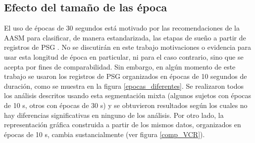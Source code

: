 
\subsection{Efecto del tamaño de las época}

El uso de épocas de 30 segundos está motivado por las recomendaciones de la AASM para 
clasificar, de manera estandarizada, las etapas de sueño a partir de registros de PSG 
\cite{AASM07}. 
No se discutirán en este trabajo motivaciones o evidencia para usar esta longitud de época en 
particular, ni para el caso contrario, sino que se acepta por fines de comparabilidad. 
Sin embargo, en algún momento de este trabajo se usaron los registros de PSG organizados en 
épocas de 10 segundos de duración, como se muestra en la figura \ref{epocas_diferentes}. 
Se realizaron todos los análisis descritos usando esta segmentación mixta (algunos sujetos con 
épocas de 10 s, otros con épocas de 30 s) y se obtuvieron resultados según los cuales no hay 
diferencias significativas en ninguno de los análisis. 
Por otro lado, la representación gráfica construida a partir de los mismos datos, organizados
en épocas de 10 s, cambia sustancialmente (ver figura \ref{comp_VCR}).

